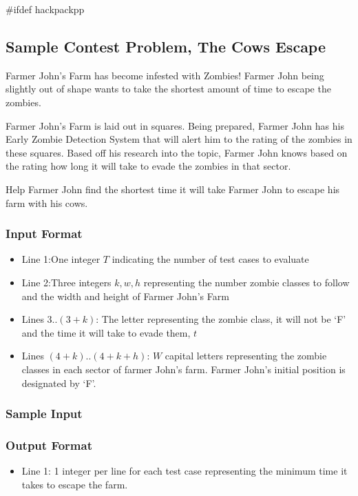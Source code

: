 #ifdef hackpackpp
\subsection{Sample Contest Problem, The Cows Escape}
Farmer John's Farm has become infested with Zombies!
Farmer John being slightly out of shape wants to take the shortest amount of time to escape the zombies.

Farmer John's Farm is laid out in squares.
Being prepared, Farmer John has his Early Zombie Detection System that will alert him to the rating of the zombies in these squares.
Based off his research into the topic, Farmer John knows based on the rating how long it will take to evade the zombies in that sector.

Help Farmer John find the shortest time it will take Farmer John to escape his farm with his cows.

\subsubsection{Input Format}
\begin{itemize}
	\item Line 1:One integer $T$ indicating the number of test cases to evaluate
	\item Line 2:Three integers $k,w,h$ representing the number zombie classes to follow and the width and height of Farmer John's Farm
	\item Lines 3..$(3+k)$: The letter representing the zombie class, it will not be `F' and the time it will take to evade them, $t$
	\item Lines $(4+k)$..$(4+k+h)$: $W$ capital letters representing the zombie classes in each sector of farmer John's farm.  Farmer John's initial position is designated by `F'.
\end{itemize}

\subsubsection{Sample Input}

\subsubsection{Output Format}
\begin{itemize}
	\item Line 1:  1 integer per line for each test case representing the minimum time it takes to escape the farm.
\end{itemize}

